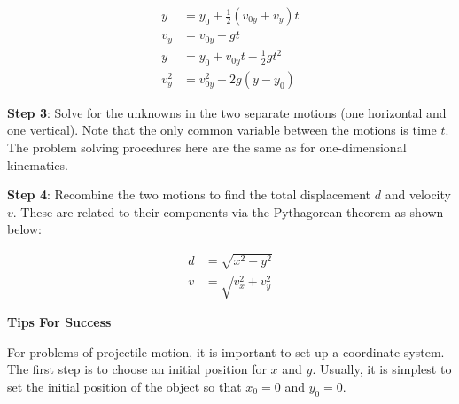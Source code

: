 \documentclass[main-physics.tex]{subfiles}
\begin{document}
\begin{align}
    y &= y_0 + \frac{1}{2}\left(v_{0y} + v_y\right)t\\[0.5ex]
    v_y &= v_{0y} - gt \label{SjYaoE} \\[0.5ex]
    y &= y_0 + v_{0y}t - \frac{1}{2}  g t^2  \label{36YuvF} \\[0.5ex]
    v_y^2 &= v_{0y}^2 - 2 g (y - y_0) \label{wROSXN}
\end{align}

\vspace{1em}

\textbf{Step 3}: Solve for the unknowns in the two separate motions (one horizontal and one vertical). Note that the only common variable between the motions is time $t$. The problem solving procedures here are the same as for one-dimensional kinematics.

\vspace{1em}

\textbf{Step 4}: Recombine the two motions to find the total displacement $d$ and velocity $v$. These are related to their components via the Pythagorean theorem as shown below:

\begin{align}
    d &= \sqrt{x^2 + y^2} \label{XvIie8} \\[0.5ex]
    v &= \sqrt{v_x^2 + v_y^2} \label{glASeI}
\end{align}

\begin{mdframed}[backgroundcolor=black!10]
    \textbf{Tips For Success}
    
    \vspace{1ex}
    
    For problems of projectile motion, it is important to set up a coordinate system. The first step is to choose an initial position for $x$ and $y$. Usually, it is simplest to set the initial position of the object so that $x_0 = 0$ and $y_0 = 0$.
\end{mdframed}
\end{document}
